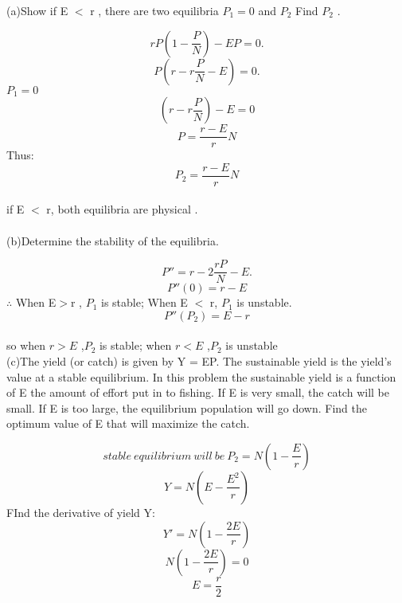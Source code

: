 \documentclass[12pt]{article}
\begin{document}
(a)Show if E $<$ r , there are two equilibria $P_{1}=0$ and $P_{2}$ Find $P_{2}$  .

\[
rP(1-\frac{P}{N})-EP=0. \]
\[
P(r-r\frac{P}{N}-E)=0.
\]
$P_{1}=0$
\[(r-r\frac{P}{N})-E=0\]
\[P=\frac{r-E}{r}N\]
Thus:\[P_{2}=\frac{r-E}{r}N\]\\
if E $<$ r, both equilibria are physical .\\
\\
(b)Determine the stability of the equilibria.

\[
P''=r-2\dfrac{rP}{N}-E.
\]
\[P''(0)=r-E\]
$\therefore $ When E$>$r , $P_{1}$ is stable; When E $<$ r, $P_{1}$ is unstable.\\
\[P''(P_{2})= E-r\] \\so when $r>E$  ,$P_{2}$  is  stable;  when $r<E$ ,$P_{2}$  is unstable  
\\

\pagebreak
(c)The yield (or catch) is given by Y = EP. The sustainable yield is the yield's value at a stable equilibrium. In this problem the sustainable yield is a function of E the amount of effort put in to fishing. If E is very small, the catch will be small. If E is too large, the equilibrium population will go down. Find the optimum value of E that will maximize the catch.

\[
stable\ equilibrium \ will \ be \ P_{2} = N(1-\frac{E}{r})
\]
\[Y=N(E-\frac{E^2}{r})\]
FInd the derivative of yield Y: \\
\[Y'=N(1-\frac{2E}{r})\]
\[N(1-\frac{2E}{r})=0\]
\[E=\frac{r}{2}\]
\end{document}
